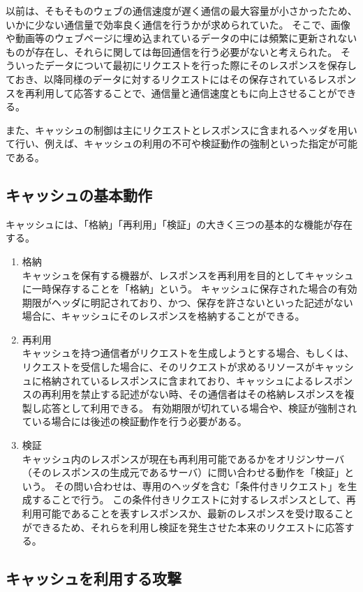 以前は、そもそものウェブの通信速度が遅く通信の最大容量が小さかったため、いかに少ない通信量で効率良く通信を行うかが求められていた。
そこで、画像や動画等のウェブページに埋め込まれているデータの中には頻繁に更新されないものが存在し、それらに関しては毎回通信を行う必要がないと考えられた。
そういったデータについて最初にリクエストを行った際にそのレスポンスを保存しておき、以降同様のデータに対するリクエストにはその保存されているレスポンスを再利用して応答することで、通信量と通信速度ともに向上させることができる。

また、キャッシュの制御は主にリクエストとレスポンスに含まれるヘッダを用いて行い、例えば、キャッシュの利用の不可や検証動作の強制といった指定が可能である。

\subsection{キャッシュの基本動作}
キャッシュには、「格納」「再利用」「検証」の大きく三つの基本的な機能が存在する。

\begin{enumerate}
\item 格納\\
キャッシュを保有する機器が、レスポンスを再利用を目的としてキャッシュに一時保存することを「格納」という。
キャッシュに保存された場合の有効期限がヘッダに明記されており、かつ、保存を許さないといった記述がない場合に、キャッシュにそのレスポンスを格納することができる。
\item 再利用\\
キャッシュを持つ通信者がリクエストを生成しようとする場合、もしくは、リクエストを受信した場合に、そのリクエストが求めるリソースがキャッシュに格納されているレスポンスに含まれており、キャッシュによるレスポンスの再利用を禁止する記述がない時、その通信者はその格納レスポンスを複製し応答として利用できる。
有効期限が切れている場合や、検証が強制されている場合には後述の検証動作を行う必要がある。
\item 検証\\
キャッシュ内のレスポンスが現在も再利用可能であるかをオリジンサーバ（そのレスポンスの生成元であるサーバ）に問い合わせる動作を「検証」という。
その問い合わせは、専用のヘッダを含む「条件付きリクエスト」を生成することで行う。
この条件付きリクエストに対するレスポンスとして、再利用可能であることを表すレスポンスか、最新のレスポンスを受け取ることができるため、それらを利用し検証を発生させた本来のリクエストに応答する。
\end{enumerate}

\subsection{キャッシュを利用する攻撃}

